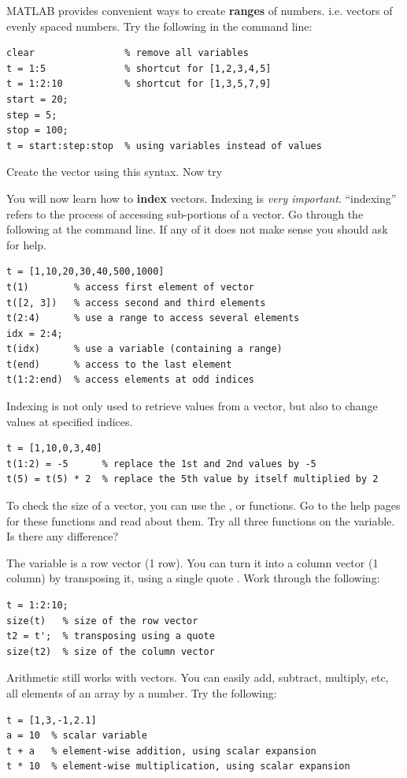 \documentclass{article}
\begin{document}
MATLAB provides convenient ways to create \textbf{ranges} of numbers. i.e. vectors of evenly spaced numbers.
Try the following in the command line:
\begin{lstlisting}
clear                % remove all variables
t = 1:5              % shortcut for [1,2,3,4,5]
t = 1:2:10           % shortcut for [1,3,5,7,9]
start = 20;
step = 5;
stop = 100;
t = start:step:stop  % using variables instead of values
\end{lstlisting}
Create the vector \mcode{[5,8,11,14]} using this syntax. Now try \mcode{[-1,-2,-3,-4]}

You will now learn how to \textbf{index} vectors.
Indexing is \emph{very important}.
``indexing'' refers to the process of accessing sub-portions of a vector.
Go through the following at the command line.
If any of it does not make sense you should ask for help.
\begin{lstlisting}
t = [1,10,20,30,40,500,1000]
t(1)        % access first element of vector
t([2, 3])   % access second and third elements
t(2:4)      % use a range to access several elements
idx = 2:4;
t(idx)      % use a variable (containing a range)
t(end)      % access to the last element
t(1:2:end)  % access elements at odd indices
\end{lstlisting}

Indexing is not only used to retrieve values from a vector, but also to change values at specified indices.
\begin{lstlisting}
t = [1,10,0,3,40]
t(1:2) = -5      % replace the 1st and 2nd values by -5
t(5) = t(5) * 2  % replace the 5th value by itself multiplied by 2
\end{lstlisting}

To check the size of a vector, you can use the ,  or  functions.
Go to the help pages for these functions and read about them.
Try all three functions on the  variable. Is there any difference?

The variable  is a row vector (1 row).
You can turn it into a column vector (1 column) by transposing it, using a single quote .
Work through the following:
\begin{lstlisting}
t = 1:2:10;
size(t)   % size of the row vector
t2 = t';  % transposing using a quote
size(t2)  % size of the column vector
\end{lstlisting}

Arithmetic still works with vectors.
You can easily add, subtract, multiply, etc, all elements of an array by a number.
Try the following:
\begin{lstlisting}
t = [1,3,-1,2.1]
a = 10  % scalar variable
t + a   % element-wise addition, using scalar expansion
t * 10  % element-wise multiplication, using scalar expansion
\end{lstlisting}
\end{document}
